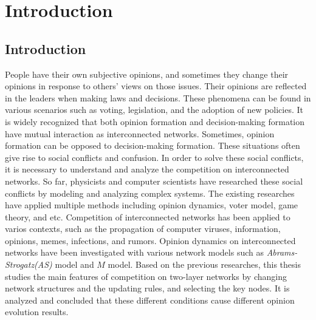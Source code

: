 
\chapter{Introduction}
\label{chap1}
\section{Introduction}
People have their own subjective opinions, and sometimes they change their opinions in response to others' views on those issues. Their opinions are reflected in the leaders when making laws and decisions. These phenomena can be found in various scenarios such as voting, legislation, and the adoption of new policies. It is widely recognized that both opinion formation and decision-making formation have mutual interaction as interconnected networks\parencite{mikko2014, danziger2019, newman2010, boccaletti2014, domenico2013, tomasini2015, namkhanhvu2017}. Sometimes, opinion formation can be opposed to decision-making formation. These situations often give rise to social conflicts and confusion. In order to solve these social conflicts, it is necessary to understand and analyze the competition on interconnected networks. So far, physicists and computer scientists have researched these social conflicts by modeling and analyzing complex systems\parencite{fangwu2004, zuev2012, laguna2004, masuda2014}. The existing researches have applied multiple methods including opinion dynamics\parencite{amato2017, haibo2017, amato2017, quattrociocchi2014}, voter model\parencite{redner2005, casey2009}, game theory\parencite{smyrnakis2019}, and etc\parencite{bianconi2018}. 
Competition of interconnected networks has been applied to varios contexts, such as the propagation of computer viruses\parencite{serazzi2003}, information\parencite{hua2014}, opinions\parencite{alvarez2016, gomez2015,diep2017,rocca2014, velasquez2018}, memes\parencite{massad2013}, infections\parencite{shenyu2018, zhou2018}, and rumors\parencite{liu2018}. Opinion dynamics on interconnected networks have been investigated with various network models such as \textit{Abrams-Strogatz(AS)} model\parencite{abrams2003,vazquez2010} and $M$ model\parencite{rocca2014}.  Based on the previous researches, this thesis studies the main features of competition on two-layer networks by changing network structures and the updating rules, and selecting the key nodes. It is analyzed and concluded that these different conditions cause different opinion evolution results.

